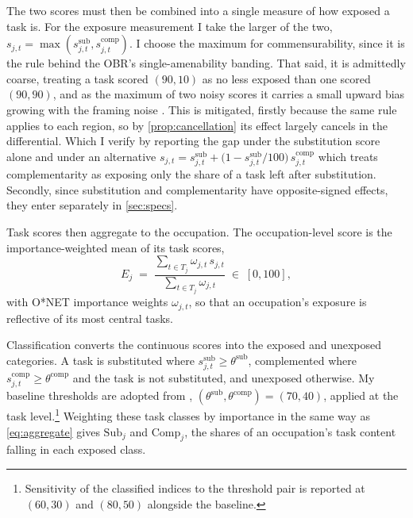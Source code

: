 The two scores must then be combined into a single measure of how exposed a task is. For the exposure measurement I take the larger of the two, $s_{j,t} = \max(s^{\mathrm{sub}}_{j,t}, s^{\mathrm{comp}}_{j,t})$. I choose the maximum for commensurability, since it is the rule behind the OBR's single-amenability banding. That said, it is admittedly coarse, treating a task scored $(90,10)$ as no less exposed than one scored $(90,90)$, and as the maximum of two noisy scores it carries a small upward bias growing with the framing noise \citep{clark1961}. This is mitigated, firstly because the same rule applies to each region, so by \cref{prop:cancellation} its effect largely cancels in the differential. Which I verify by reporting the gap under the substitution score alone and under an alternative $s_{j,t} = s^{\mathrm{sub}}_{j,t} + \bigl(1 - s^{\mathrm{sub}}_{j,t}/100\bigr)\, s^{\mathrm{comp}}_{j,t}$ which treats complementarity as exposing only the share of a task left after substitution. Secondly, since substitution and complementarity have opposite-signed effects, they enter separately in \cref{sec:specs}.

Task scores then aggregate to the occupation. The occupation-level score is the importance-weighted mean of its task scores,
\begin{equation}\label{eq:aggregate}
E_j \;=\; \frac{\sum_{t \in T_j} \omega_{j,t}\, s_{j,t}}
               {\sum_{t \in T_j} \omega_{j,t}} \;\in\; [0,100],
\end{equation}
with O*NET importance weights $\omega_{j,t}$, so that an occupation's exposure is reflective of its most central tasks. 

Classification converts the continuous scores into the exposed and unexposed categories. A task is substituted where $s^{\mathrm{sub}}_{j,t} \ge \theta^{\mathrm{sub}}$, complemented where $s^{\mathrm{comp}}_{j,t} \ge \theta^{\mathrm{comp}}$ and the task is not substituted, and unexposed otherwise. My baseline thresholds are adopted from \citet{obr2025}, $(\theta^{\mathrm{sub}}, \theta^{\mathrm{comp}}) = (70, 40)$, applied at the task level.\footnote{Sensitivity of the classified indices to the threshold pair is reported at $(60,30)$ and $(80,50)$ alongside the baseline.} Weighting these task classes by importance in the same way as \cref{eq:aggregate} gives $\mathrm{Sub}_j$ and $\mathrm{Comp}_j$, the shares of an occupation's task content falling in each exposed class.

